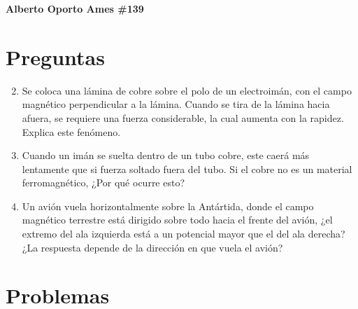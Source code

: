 \documentclass[10pt, twoside]{article}
\begin{document}
\thispagestyle{fancy}

\textbf{Alberto Oporto Ames \#139}

\section{Preguntas}%
\label{sec:preguntas}

\begin{enumerate}
	\setcounter{enumi}{1}
	\item Se coloca una lámina de cobre sobre el polo de un electroimán,
		con el campo magnético perpendicular a la lámina.
		Cuando se tira de la lámina hacia afuera,
		se requiere una fuerza considerable,
		la cual aumenta con la rapidez.
		Explica este fenómeno.
	\setcounter{enumi}{3}
	\item Cuando un imán se suelta dentro de un tubo cobre,
		este caerá más lentamente que si fuerza soltado fuera del tubo.
		Si el cobre no es un material ferromagnético,
		¿Por qué ocurre esto?
	\item Un avión vuela horizontalmente sobre la Antártida,
		donde el campo magnético terrestre está dirigido sobre todo hacia el
		frente del avión,
		¿el extremo del ala izquierda está a un potencial mayor que el del ala
		derecha?
		¿La respuesta depende de la dirección en que vuela el avión?
\end{enumerate}

\section{Problemas}%
\label{sec:problemas}
\end{document}

